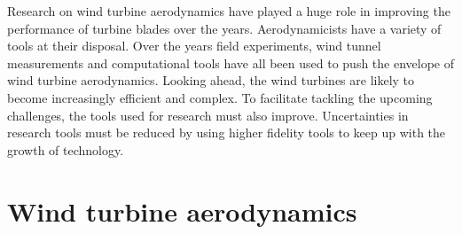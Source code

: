 Research on wind turbine aerodynamics have played a huge role in improving the performance of turbine blades over the years. Aerodynamicists have a variety of tools at their disposal. Over the years field experiments, wind tunnel measurements and computational tools have all been used to push the envelope of wind turbine aerodynamics. Looking ahead, the wind turbines are likely to become increasingly efficient and complex. To facilitate tackling the upcoming challenges, the tools used for research must also improve. Uncertainties in research tools must be reduced by using higher fidelity tools to keep up with the growth of technology. 

\section{Wind turbine aerodynamics}

